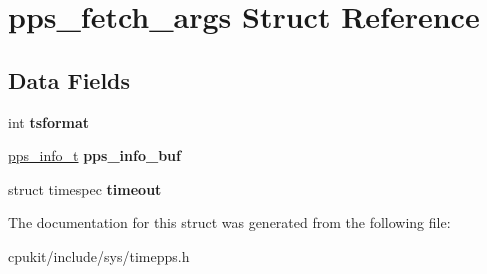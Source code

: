 \hypertarget{structpps__fetch__args}{}\section{pps\+\_\+fetch\+\_\+args Struct Reference}
\label{structpps__fetch__args}
\subsection*{Data Fields}
\begin{DoxyCompactItemize}
\item 
\mbox{\label{structpps__fetch__args_a27f4171fd6601c41546a5001e700a22b}} 
int {\bfseries tsformat}
\item 
\mbox{\label{structpps__fetch__args_accc7397f0666f6bbc507779b04fd2446}} 
\mbox{\hyperlink{structpps__info__t}{pps\+\_\+info\+\_\+t}} {\bfseries pps\+\_\+info\+\_\+buf}
\item 
\mbox{\label{structpps__fetch__args_ad941a2639a6c0f256b74eb8f489f2aa0}} 
struct timespec {\bfseries timeout}
\end{DoxyCompactItemize}


The documentation for this struct was generated from the following file\+:\begin{DoxyCompactItemize}
\item 
cpukit/include/sys/timepps.\+h\end{DoxyCompactItemize}
